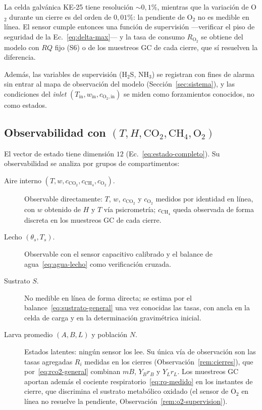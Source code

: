 \begin{remark}\label{rem:o2-supervision}
La celda galvánica KE-25 tiene resolución $\sim 0{,}1\%$, mientras que la
variación de O$_2$ durante un cierre es del orden de $0{,}01\%$: la
pendiente de O$_2$ no es medible en línea. El sensor cumple entonces una
función de supervisión ---verificar el piso de seguridad de la
Ec.~\eqref{eq:delta-max}--- y la tasa de consumo $R_{\mathrm{O_2}}$ se
obtiene del modelo con $RQ$ fijo (S6) o de los muestreos GC de cada cierre,
que sí resuelven la diferencia.
\end{remark}

Además, las variables de supervisión (H$_2$S, NH$_3$) se registran con
fines de alarma sin entrar al mapa de observación del modelo
(Sección~\ref{sec:sistema}), y las condiciones del \emph{inlet}
$(T_{\mathrm{in}}, w_{\mathrm{in}}, c_{\mathrm{O_2,in}})$ se miden como
forzamientos conocidos, no como estados.

\subsection{Observabilidad con $(T, H, \mathrm{CO_2}, \mathrm{CH_4}, \mathrm{O_2})$}\label{sec:observabilidad}

El vector de estado tiene dimensión $12$
(Ec.~\eqref{eq:estado-completo}). Su observabilidad se analiza por
grupos de compartimentos:

\begin{description}
  \item[Aire interno $(T, w, c_{\mathrm{CO_2}}, c_{\mathrm{CH_4}}, c_{\mathrm{O_2}})$.]
  Observable directamente: $T$, $w$, $c_{\mathrm{CO_2}}$ y $c_{\mathrm{O_2}}$ medidos por identidad en línea, con $w$
  obtenido de $H$ y $T$ vía psicrometría; $c_{\mathrm{CH_4}}$ queda observada de
  forma discreta en los muestreos GC de cada cierre.
  \item[Lecho $(\theta_s, T_s)$.] Observable con el sensor capacitivo
  calibrado y el balance de agua~\eqref{eq:agua-lecho} como verificación
  cruzada.
  \item[Sustrato $S$.] No medible en línea de forma directa; se estima
  por el balance~\eqref{eq:sustrato-general} una vez conocidas las tasas,
  con ancla en la celda de carga y en la determinación gravimétrica
  inicial.
  \item[Larva promedio $(A, B, L)$ y población $N$.] Estados latentes:
  ningún sensor los lee. Su única vía de observación son las tasas
  agregadas $R_i$ medidas en los cierres
  (Observación~\ref{rem:cierres}), que por~\eqref{eq:rco2-general}
  combinan $mB$, $Y_B r_B$ y $Y_L r_L$. Los muestreos GC
  aportan además el cociente respiratorio~\eqref{eq:rq-medido} en los
  instantes de cierre, que discrimina el sustrato metabólico oxidado (el
  sensor de O$_2$ en línea no resuelve la pendiente,
  Observación~\ref{rem:o2-supervision}).
\end{description}

